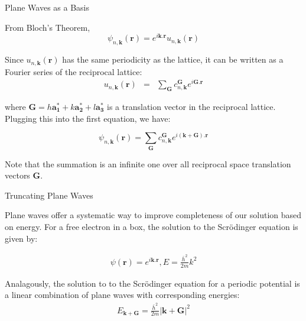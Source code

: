 \documentclass[aspectratio=169]{beamer}
\let \vec \mathbf
\begin{document}
    \begin{frame}{Plane Waves as a Basis}

        From Bloch's Theorem,
        \begin{equation*}
            \psi_{n,\vec{k}}(\vec{r}) = e^{i\vec{k}.\vec{r}}u_{n,\vec{k}}(\vec{r})
        \end{equation*}

        Since $u_{n,\vec{k}}(\vec{r})$ has the same periodicity as the lattice, it can be written as a Fourier series of the reciprocal lattice:
        \begin{eqnarray*}
            u_{n,\vec{k}}(\vec{r}) & = & \sum_{\vec{G}} c^{\vec{G}}_{n,\vec{k}} e^{i\vec{G}.\vec{r}}
        \end{eqnarray*}

        where $\vec{G} = h \vec{a_1^*} + k \vec{a_2^*} + l \vec{a_3^*}$ is a translation vector in the reciprocal lattice. Plugging this into the first equation, we have:

        \begin{equation*}
            \psi_{n,\vec{k}}(\vec{r}) = \sum_{\vec{G}} c^{\vec{G}}_{n,\vec{k}} e^{i(\vec{k}+\vec{G}).\vec{r}}
        \end{equation*}

        Note that the summation is an infinite one over all reciprocal space translation vectors $\vec{G}$.

    \end{frame}

    \begin{frame}{Truncating Plane Waves}

        Plane waves offer a systematic way to improve completeness of our solution based on energy. \newline
        \newline
        For a free electron in a box, the solution to the Scr\"odinger equation is given by:

        \begin{eqnarray*}
            \psi(\vec{r}) = e^{i\vec{k}.\vec{r}}, E = \frac{\bar{h}^2}{2m}k^2
        \end{eqnarray*}

        Analagously, the solution to to the Scr\"odinger equation for a periodic potential is a linear combination of plane waves with corresponding energies:
        \begin{eqnarray*}
            E_{\vec{k}+\vec{G}} = \frac{\bar{h}^2}{2m}|\vec{k}+\vec{G}|^2
        \end{eqnarray*}

    \end{frame}
\end{document}
